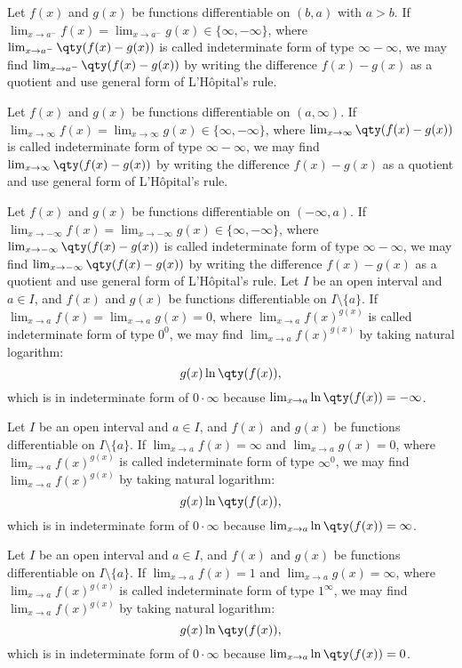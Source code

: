 \documentclass[a4paper,12pt]{report}
\begin{document}
\begin{itemize}
\begin{itemize}
Let $f(x)$ and $g(x)$ be functions differentiable on $(b,a)$ with $a>b$. If $\lim_{x\to a^-}f(x)=\lim_{x\to a^-}g(x)\in\{\infty,-\infty\}$, where $\lim_{x\to a^-}\qty(f(x)-g(x))$ is called indeterminate form of type $\infty-\infty$, we may find $\lim_{x\to a^-}\qty(f(x)-g(x))$ by writing the difference $f(x)-g(x)$ as a quotient and use general form of L'Hôpital's rule.

Let $f(x)$ and $g(x)$ be functions differentiable on $(a,\infty)$. If $\lim_{x\to\infty}f(x)=\lim_{x\to\infty}g(x)\in\{\infty,-\infty\}$, where $\lim_{x\to\infty}\qty(f(x)-g(x))$ is called indeterminate form of type $\infty-\infty$, we may find $\lim_{x\to\infty}\qty(f(x)-g(x))$ by writing the difference $f(x)-g(x)$ as a quotient and use general form of L'Hôpital's rule.

Let $f(x)$ and $g(x)$ be functions differentiable on $(-\infty,a)$. If $\lim_{x\to -\infty}f(x)=\lim_{x\to -\infty}g(x)\in\{\infty,-\infty\}$, where $\lim_{x\to -\infty}\qty(f(x)-g(x))$ is called indeterminate form of type $\infty-\infty$, we may find $\lim_{x\to -\infty}\qty(f(x)-g(x))$ by writing the difference $f(x)-g(x)$ as a quotient and use general form of L'Hôpital's rule.
Let $I$ be an open interval and $a\in I$, and $f(x)$ and $g(x)$ be functions differentiable on $I\setminus\{a\}$. If $\lim_{x\to a}f(x)=\lim_{x\to a}g(x)=0$, where $\lim_{x\to a}f(x)^{g(x)}$ is called indeterminate form of type $0^0$, we may find $\lim_{x\to a}f(x)^{g(x)}$ by taking natural logarithm:
\[g(x)\ln\qty(f(x)),\]
which is in indeterminate form of $0\cdot\infty$ because $\lim_{x\to a}\ln\qty(f(x))=-\infty$.

Let $I$ be an open interval and $a\in I$, and $f(x)$ and $g(x)$ be functions differentiable on $I\setminus\{a\}$. If $\lim_{x\to a}f(x)=\infty$ and $\lim_{x\to a}g(x)=0$, where $\lim_{x\to a}f(x)^{g(x)}$ is called indeterminate form of type $\infty^0$, we may find $\lim_{x\to a}f(x)^{g(x)}$ by taking natural logarithm:
\[g(x)\ln\qty(f(x)),\]
which is in indeterminate form of $0\cdot\infty$ because $\lim_{x\to a}\ln\qty(f(x))=\infty$.

Let $I$ be an open interval and $a\in I$, and $f(x)$ and $g(x)$ be functions differentiable on $I\setminus\{a\}$. If $\lim_{x\to a}f(x)=1$ and $\lim_{x\to a}g(x)=\infty$, where $\lim_{x\to a}f(x)^{g(x)}$ is called indeterminate form of type $1^{\infty}$, we may find $\lim_{x\to a}f(x)^{g(x)}$ by taking natural logarithm:
\[g(x)\ln\qty(f(x)),\]
which is in indeterminate form of $0\cdot\infty$ because $\lim_{x\to a}\ln\qty(f(x))=0$.


\end{itemize}
\end{itemize}
\end{document}
